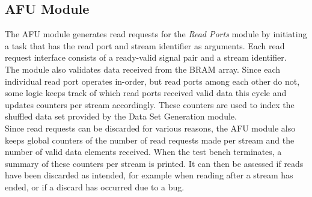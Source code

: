 


\subsection{AFU Module}
The AFU module generates read requests for the \textit{Read Ports} module by initiating a task that has the read port and stream identifier as arguments. Each read request interface consists of a ready-valid signal pair and a stream identifier.\\
The module also validates data received from the BRAM array. Since each individual read port operates in-order, but read ports among each other do not, some logic keeps track of which read ports received valid data this cycle and updates counters per stream accordingly. These counters are used to index the shuffled data set provided by the Data Set Generation module.\\
Since read requests can be discarded for various reasons, the AFU module also keeps global counters of the number of read requests made per stream and the number of valid data elements received. When the test bench terminates, a summary of these counters per stream is printed. It can then be assessed if reads have been discarded as intended, for example when reading after a stream has ended, or if a discard has occurred due to a bug.



